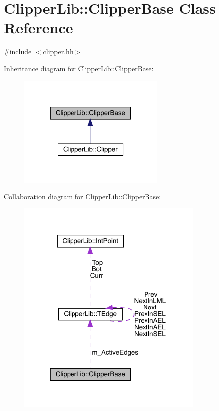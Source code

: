 \hypertarget{class_clipper_lib_1_1_clipper_base}{}\section{Clipper\+Lib\+::Clipper\+Base Class Reference}
\label{class_clipper_lib_1_1_clipper_base}


{\ttfamily \#include $<$clipper.\+hh$>$}



Inheritance diagram for Clipper\+Lib\+::Clipper\+Base\+:
\nopagebreak
\begin{figure}[H]
\begin{center}
\leavevmode
\includegraphics[width=201pt]{class_clipper_lib_1_1_clipper_base__inherit__graph}
\end{center}
\end{figure}


Collaboration diagram for Clipper\+Lib\+::Clipper\+Base\+:
\nopagebreak
\begin{figure}[H]
\begin{center}
\leavevmode
\includegraphics[width=255pt]{class_clipper_lib_1_1_clipper_base__coll__graph}
\end{center}
\end{figure}
